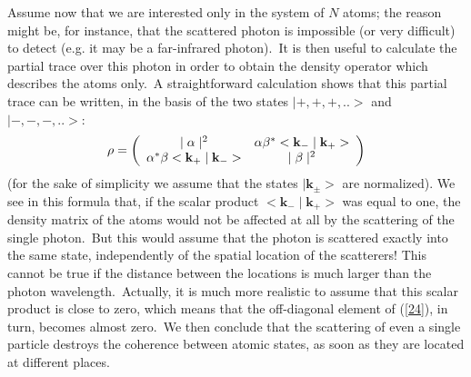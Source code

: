 \documentclass[12pt,onecolumn]{article}%
\begin{document}
Assume now that we are interested only in the system of $N$ atoms; the reason
might be, for instance, that the scattered photon is impossible (or very
difficult) to detect (e.g. it may be a far-infrared photon).\ It is then
useful to calculate the partial trace over this photon in order to obtain the
density operator which describes the atoms only.\ A straightforward
calculation shows that this partial trace can be written, in the basis of the
two states $\mid+,+,+,..>$ and $\mid-,-,-,..>:$%
\begin{equation}
\rho=\left(
\begin{array}
[c]{cc}%
\mid\alpha\mid^{2} & \alpha\beta^{\ast}<\mathbf{k}_{-}\mid\mathbf{k}_{+}>\\
\alpha^{\ast}\beta<\mathbf{k}_{+}\mid\mathbf{k}_{-}> & \mid\beta\mid^{2}%
\end{array}
\right)  \label{24}%
\end{equation}
(for the sake of simplicity we assume that the states $\mid\mathbf{k}_{\pm}>$
are normalized). We see in this formula that, if the scalar product
$<\mathbf{k}_{-}\mid\mathbf{k}_{+}>$ was equal to one, the density matrix of
the atoms would not be affected at all by the scattering of the single
photon.\ But this would assume that the photon is scattered exactly into the
same state, independently of the spatial location of the scatterers! This
cannot be true if the distance between the locations is much larger than the
photon wavelength.\ Actually, it is much more realistic to assume that this
scalar product is close to zero, which means that the off-diagonal element of
(\ref{24}), in turn, becomes almost zero.\ We then conclude that the
scattering of even a single particle destroys the coherence between atomic
states, as soon as they are located at different places.
\end{document}
